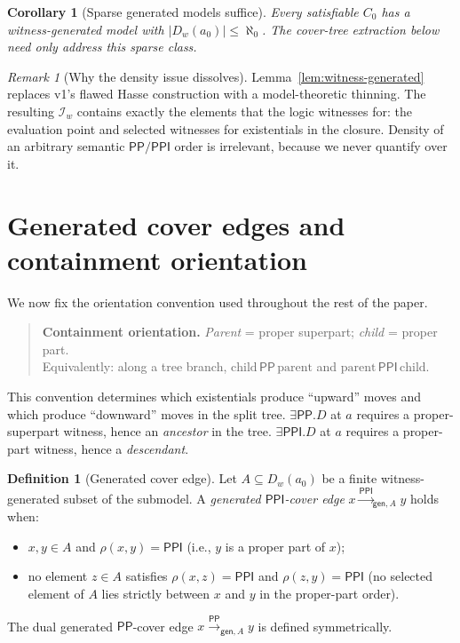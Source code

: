\documentclass[11pt]{article}
\newtheorem{corollary}[theorem]{Corollary}
\theoremstyle{definition}
\newtheorem{definition}[theorem]{Definition}
\theoremstyle{remark}
\newtheorem{remark}[theorem]{Remark}
\newcommand{\PP}{\mathsf{PP}}
\newcommand{\PPI}{\mathsf{PPI}}
\newcommand{\gen}{\mathsf{gen}}
\begin{document}
\begin{corollary}[Sparse generated models suffice]\label{cor:sparse}
Every satisfiable $C_0$ has a witness-generated model with $|D_w(a_0)|
\le \aleph_0$.  The cover-tree extraction below need only address
this sparse class.
\end{corollary}

\begin{remark}[Why the density issue dissolves]
Lemma~\ref{lem:witness-generated} replaces v1's flawed Hasse
construction with a model-theoretic thinning.  The resulting
$\mathcal{I}_w$ contains exactly the elements that the logic
witnesses for: the evaluation point and selected witnesses for
existentials in the closure.  Density of an arbitrary semantic
$\PP/\PPI$ order is irrelevant, because we never quantify over it.
\end{remark}


\section{Generated cover edges and containment orientation}
\label{sec:generated-covers}

We now fix the orientation convention used throughout the rest of
the paper.

\begin{quote}
\textbf{Containment orientation.}\;
\emph{Parent} = proper superpart; \emph{child} = proper part.\\
Equivalently: along a tree branch, $\text{child}\,\PP\,\text{parent}$
and $\text{parent}\,\PPI\,\text{child}$.
\end{quote}

This convention determines which existentials produce ``upward''
moves and which produce ``downward'' moves in the split tree.
$\exists\PP.D$ at $a$ requires a proper-superpart witness, hence an
\emph{ancestor} in the tree.  $\exists\PPI.D$ at $a$ requires a
proper-part witness, hence a \emph{descendant}.

\begin{definition}[Generated cover edge]\label{def:generated-cover}
Let $A \subseteq D_w(a_0)$ be a finite witness-generated subset of
the submodel.  A \emph{generated $\PPI$-cover edge}
$x \xrightarrow{\PPI}_{\gen,A} y$ holds when:
\begin{itemize}
\item $x, y \in A$ and $\rho(x,y) = \PPI$ (i.e., $y$ is a proper
  part of $x$);
\item no element $z \in A$ satisfies $\rho(x,z) = \PPI$ and
  $\rho(z,y) = \PPI$ (no selected element of $A$ lies strictly
  between $x$ and $y$ in the proper-part order).
\end{itemize}
The dual generated $\PP$-cover edge $x \xrightarrow{\PP}_{\gen,A} y$
is defined symmetrically.
\end{definition}
\end{document}
